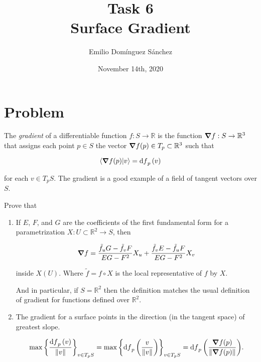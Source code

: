 \documentclass[
    12pt, %
]{fphw}
\title{Task 6 \\ Surface Gradient} %
\author{Emilio Domínguez Sánchez} %
\date{November 14th, 2020} %
\institute{University of Murcia \\ Faculty of Mathematics} %
\newcommand{\R}{\mathbb{R}}
\newcommand{\tf}{\tilde{f}}
\begin{document}
\maketitle %


\section*{Problem}

\begin{problem}

    The \emph{gradient} of a differentiable function $f : S \to \R$ is the function
$\grad{f} : S \to \R^3$ that assigns each point $p \in S$ the vector
$\grad{f}(p) \in T_p \subset \R^3$ such that

\begin{equation*}
    \braket{\grad{f}(p)}{v} = \dd{f}_p(v)
\end{equation*}

\noindent
for each $v \in T_pS$.
The gradient is a good example of a field of tangent vectors over $S$.

    Prove that

\begin{enumerate}
    \item If $E$, $F$, and $G$ are the coefficients of the first fundamental form
    for a parametrization $X : U \subset \R^2 \to S$, then

    \begin{equation*}
        \grad{f} = \frac{\tf_uG - \tf_vF}{EG-F^2}X_u + \frac{\tf_vE - \tf_uF}{EG-F^2}X_v
    \end{equation*}

    inside $X(U)$.
    Where $\tf = f \circ X$ is the local representative of $f$ by $X$.

    And in particular, if $S = \R^2$ then the definition matches the usual definition
    of gradient for functions defined over $\R^2$.

    \item The gradient for a surface points in the direction (in the tangent space)
    of greatest slope.

    \begin{equation*}
        \max\qty{\frac{\dd{f}_p(v)}{\norm{v}}}_{v \in T_pS} =
        \max\qty{\dd{f}_p\qty(\frac{v}{\norm{v}})}_{v \in T_pS} =
        \dd{f}_p\qty(\frac{\grad{f}(p)}{\norm{\grad{f}(p)}}).
    \end{equation*}


\end{enumerate}
\end{problem}
\end{document}
